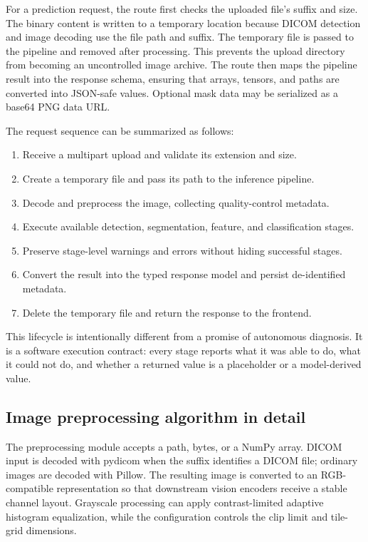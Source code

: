 \documentclass[12pt,a4paper]{article}
\begin{document}
For a prediction request, the route first checks the uploaded file's suffix and size. The binary content is written to a temporary location because DICOM detection and image decoding use the file path and suffix. The temporary file is passed to the pipeline and removed after processing. This prevents the upload directory from becoming an uncontrolled image archive. The route then maps the pipeline result into the response schema, ensuring that arrays, tensors, and paths are converted into JSON-safe values. Optional mask data may be serialized as a base64 PNG data URL.

The request sequence can be summarized as follows:
\begin{enumerate}[leftmargin=24pt]
\item Receive a multipart upload and validate its extension and size.
\item Create a temporary file and pass its path to the inference pipeline.
\item Decode and preprocess the image, collecting quality-control metadata.
\item Execute available detection, segmentation, feature, and classification stages.
\item Preserve stage-level warnings and errors without hiding successful stages.
\item Convert the result into the typed response model and persist de-identified metadata.
\item Delete the temporary file and return the response to the frontend.
\end{enumerate}

This lifecycle is intentionally different from a promise of autonomous diagnosis. It is a software execution contract: every stage reports what it was able to do, what it could not do, and whether a returned value is a placeholder or a model-derived value.

\subsection{Image preprocessing algorithm in detail}
The preprocessing module accepts a path, bytes, or a NumPy array. DICOM input is decoded with pydicom when the suffix identifies a DICOM file; ordinary images are decoded with Pillow. The resulting image is converted to an RGB-compatible representation so that downstream vision encoders receive a stable channel layout. Grayscale processing can apply contrast-limited adaptive histogram equalization, while the configuration controls the clip limit and tile-grid dimensions.
\end{document}
